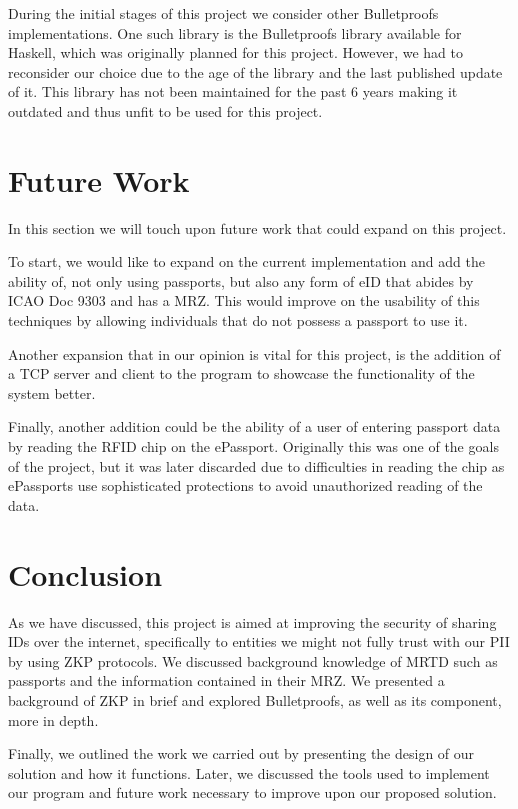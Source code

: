 \documentclass[sigconf,screen,nonacm]{acmart}
\begin{document}
  During the initial stages of this project we consider other Bulletproofs
  implementations. One such library is the Bulletproofs library available for
  Haskell, which was originally planned for this project. However, we had to
  reconsider our choice due to the age of the library and the last published
  update of it. This library has not been maintained for the past 6 years making
  it outdated and thus unfit to be used for this project.

  \section{Future Work}

  In this section we will touch upon future work that could expand on this project.

  To start, we would like to expand on the current implementation and add the ability
  of, not only using passports, but also any form of eID that abides by ICAO Doc 9303
  and has a MRZ. This would improve on the usability of this techniques by allowing
  individuals that do not possess a passport to use it.

  Another expansion that in our opinion is vital for this project, is the addition
  of a TCP server and client to the program to showcase the functionality of the
  system better.

  Finally, another addition could be the ability of a user of entering passport
  data by reading the RFID chip on the ePassport. Originally this was one of the
  goals of the project, but it was later discarded due to difficulties in reading
  the chip as ePassports use sophisticated protections to avoid unauthorized reading
  of the data.

  \section{Conclusion}

  As we have discussed, this project is aimed at improving the security of sharing
  IDs over the internet, specifically to entities we might not fully trust with
  our PII by using ZKP protocols. We discussed background knowledge of MRTD such as
  passports and the information contained in their MRZ. We presented a background of
  ZKP in brief and explored Bulletproofs, as well as its component, more in depth.

  Finally, we outlined the work we carried out by presenting the design of our solution
  and how it functions. Later, we discussed the tools used to implement our program
  and future work necessary to improve upon our proposed solution.

  
  
\end{document}
